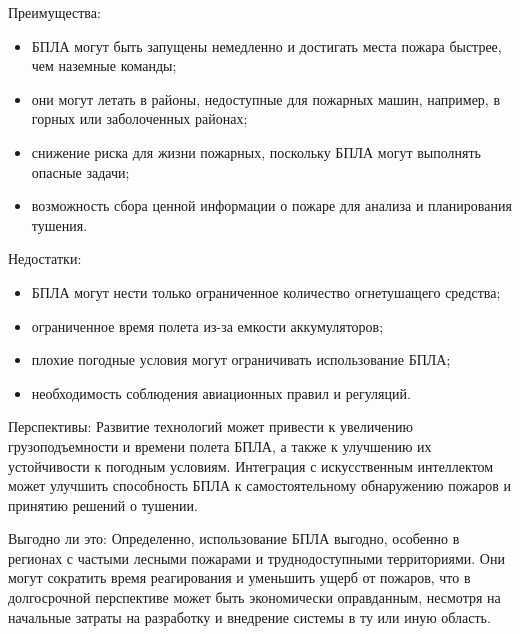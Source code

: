 Преимущества:
\begin{itemize}
	\item БПЛА могут быть запущены немедленно и достигать места пожара быстрее, чем наземные команды;
	\item они могут летать в районы, недоступные для пожарных машин, например, в горных или заболоченных районах;
	\item снижение риска для жизни пожарных, поскольку БПЛА могут выполнять опасные задачи;
	\item возможность сбора ценной информации о пожаре для анализа и планирования тушения.
\end{itemize}
Недостатки:
\begin{itemize}
	\item БПЛА могут нести только ограниченное количество огнетушащего средства;
	\item ограниченное время полета из-за емкости аккумуляторов;
	\item плохие погодные условия могут ограничивать использование БПЛА;
	\item необходимость соблюдения авиационных правил и регуляций.
\end{itemize}

Перспективы:
Развитие технологий может привести к увеличению грузоподъемности и времени полета БПЛА, а также к улучшению их устойчивости к погодным условиям. Интеграция с искусственным интеллектом может улучшить способность БПЛА к самостоятельному обнаружению пожаров и принятию решений о тушении.

Выгодно ли это:
Определенно, использование БПЛА выгодно, особенно в регионах с частыми лесными пожарами и труднодоступными территориями. Они могут сократить время реагирования и уменьшить ущерб от пожаров, что в долгосрочной перспективе может быть экономически оправданным, несмотря на начальные затраты на разработку и внедрение системы в ту или иную область.

